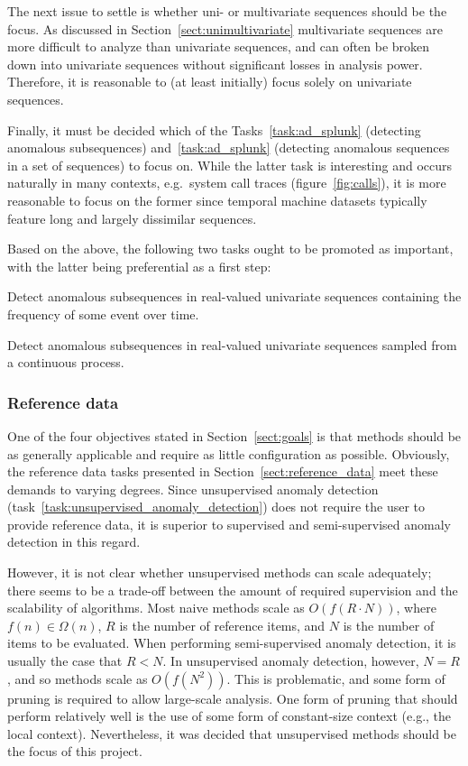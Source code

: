 The next issue to settle is whether uni- or multivariate sequences should be the focus. As discussed in Section~\ref{sect:unimultivariate} multivariate sequences are more difficult to analyze than univariate sequences, and can often be broken down into univariate sequences without significant losses in analysis power. Therefore, it is reasonable to (at least initially) focus solely on univariate sequences.

Finally, it must be decided which of the Tasks~\ref{task:ad_splunk} (detecting anomalous subsequences) and~\ref{task:ad_splunk} (detecting anomalous sequences in a set of sequences) to focus on. While the latter task is interesting and occurs naturally in many contexts, e.g.\ system call traces (figure~\ref{fig:calls}), it is more reasonable to focus on the former since temporal machine datasets typically feature long and largely dissimilar sequences.

Based on the above, the following two tasks ought to be promoted as important, with the latter being preferential as a first step:
\begin{task}
\label{task:frequency}
  Detect anomalous subsequences in real-valued univariate sequences containing the frequency of some event over time.
\end{task}
\begin{task}
\label{task:continuous}
  Detect anomalous subsequences in real-valued univariate sequences sampled from a continuous process.
\end{task}

\subsubsection{Reference data}

One of the four objectives stated in Section~\ref{sect:goals} is that methods should be as generally applicable and require as little configuration as possible. Obviously, the reference data tasks presented in Section~\ref{sect:reference_data} meet these demands to varying degrees. Since unsupervised anomaly detection (task~\ref{task:unsupervised_anomaly_detection}) does not require the user to provide reference data, it is superior to supervised and semi-supervised anomaly detection in this regard.

However, it is not clear whether unsupervised methods can scale adequately; there seems to be a trade-off between the amount of required supervision and the scalability of algorithms. Most naive methods scale as $O(f(R \cdot N))$, where $f(n) \in \Omega(n)$, $R$ is the number of reference items, and $N$ is the number of items to be evaluated. When performing semi-supervised anomaly detection, it is usually the case that $R < N$. In unsupervised anomaly detection, however, $N = R$, and so methods scale as $O(f(N^2))$. This is problematic, and some form of pruning is required to allow large-scale analysis. One form of pruning that should perform relatively well is the use of some form of constant-size context (e.g.\@, the local context). Nevertheless, it was decided that unsupervised methods should be the focus of this project.

